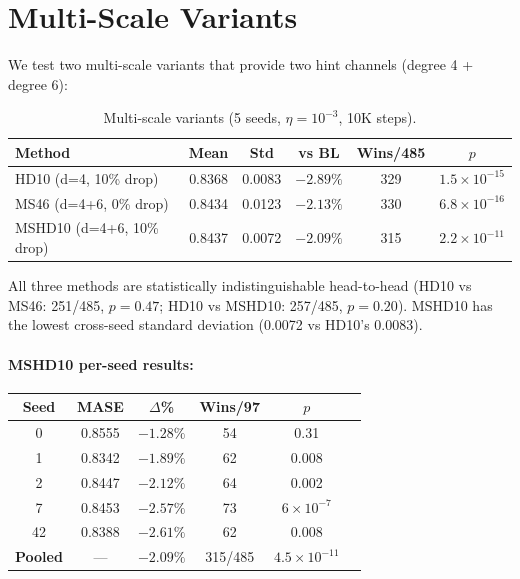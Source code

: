\documentclass{article}
\begin{document}
\section{Multi-Scale Variants}
\label{app:multiscale}

We test two multi-scale variants that provide two hint channels (degree 4 + degree 6):

\begin{table}[h]
\centering
\caption{Multi-scale variants (5 seeds, $\eta = 10^{-3}$, 10K steps).}
\small
\begin{tabular}{lccccc}
\toprule
\textbf{Method} & \textbf{Mean} & \textbf{Std} & \textbf{vs BL} & \textbf{Wins/485} & \textbf{$p$} \\
\midrule
HD10 (d=4, 10\% drop) & 0.8368 & 0.0083 & $-2.89\%$ & 329 & $1.5 \times 10^{-15}$ \\
MS46 (d=4+6, 0\% drop) & 0.8434 & 0.0123 & $-2.13\%$ & 330 & $6.8 \times 10^{-16}$ \\
MSHD10 (d=4+6, 10\% drop) & 0.8437 & 0.0072 & $-2.09\%$ & 315 & $2.2 \times 10^{-11}$ \\
\bottomrule
\end{tabular}
\end{table}

All three methods are statistically indistinguishable head-to-head (HD10 vs MS46: 251/485, $p=0.47$; HD10 vs MSHD10: 257/485, $p=0.20$). MSHD10 has the lowest cross-seed standard deviation (0.0072 vs HD10's 0.0083).

\paragraph{MSHD10 per-seed results:}

\begin{table}[h]
\centering
\small
\begin{tabular}{cccccc}
\toprule
\textbf{Seed} & \textbf{MASE} & \textbf{$\Delta$\%} & \textbf{Wins/97} & \textbf{$p$} \\
\midrule
0 & 0.8555 & $-1.28\%$ & 54 & 0.31 \\
1 & 0.8342 & $-1.89\%$ & 62 & 0.008 \\
2 & 0.8447 & $-2.12\%$ & 64 & 0.002 \\
7 & 0.8453 & $-2.57\%$ & 73 & $6 \times 10^{-7}$ \\
42 & 0.8388 & $-2.61\%$ & 62 & 0.008 \\
\midrule
\textbf{Pooled} & --- & $-2.09\%$ & 315/485 & $4.5 \times 10^{-11}$ \\
\bottomrule
\end{tabular}
\end{table}
\end{document}
